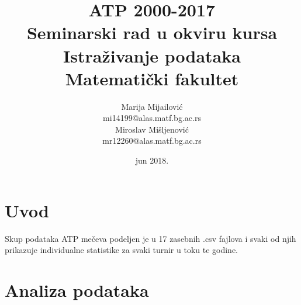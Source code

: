 \documentclass[a4paper]{article}
\begin{document}
\title{ATP 2000-2017\\ \small{Seminarski rad u okviru kursa\\Istraživanje podataka\\ Matematički fakultet}}

\author{Marija Mijailović\\ mi14199@alas.matf.bg.ac.rs\\Miroslav Mišljenović\\mr12260@alas.matf.bg.ac.rs}
\date{jun 2018.}
\maketitle


\tableofcontents


\section{Uvod}
\label{sec:uvod}

Skup podataka ATP mečeva podeljen je u 17 zasebnih .csv fajlova i svaki od njih prikazuje individualne statistike za svaki turnir u toku te godine.


\section{Analiza podataka}
\end{document}
